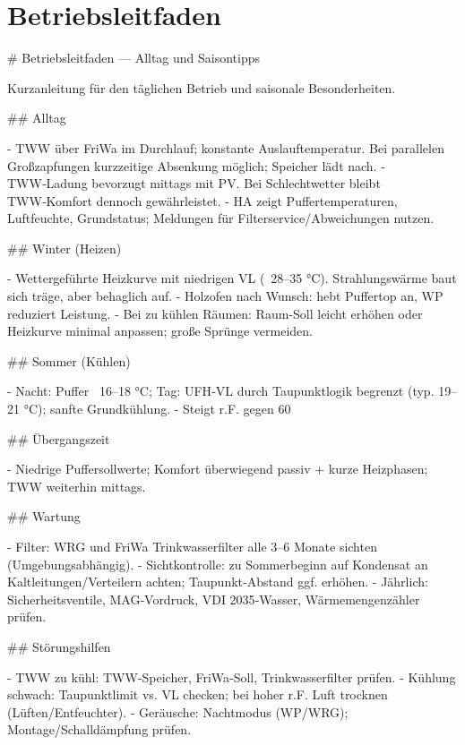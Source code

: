 \documentclass[11pt,oneside]{report}
\begin{document}
\chapter{Betriebsleitfaden}
\begin{markdown}
# Betriebsleitfaden — Alltag und Saisontipps

Kurzanleitung für den täglichen Betrieb und saisonale Besonderheiten.

## Alltag

- TWW über FriWa im Durchlauf; konstante Auslauftemperatur. Bei parallelen Großzapfungen kurzzeitige Absenkung möglich; Speicher lädt nach.
- TWW‑Ladung bevorzugt mittags mit PV. Bei Schlechtwetter bleibt TWW‑Komfort dennoch gewährleistet.
- HA zeigt Puffertemperaturen, Luftfeuchte, Grundstatus; Meldungen für Filterservice/Abweichungen nutzen.

## Winter (Heizen)

- Wettergeführte Heizkurve mit niedrigen VL (~28–35 °C). Strahlungswärme baut sich träge, aber behaglich auf.
- Holzofen nach Wunsch: hebt Puffertop an, WP reduziert Leistung.
- Bei zu kühlen Räumen: Raum‑Soll leicht erhöhen oder Heizkurve minimal anpassen; große Sprünge vermeiden.

## Sommer (Kühlen)

- Nacht: Puffer ~16–18 °C; Tag: UFH‑VL durch Taupunktlogik begrenzt (typ. 19–21 °C); sanfte Grundkühlung.
- Steigt r.F. gegen 60 %

## Übergangszeit

- Niedrige Puffersollwerte; Komfort überwiegend passiv + kurze Heizphasen; TWW weiterhin mittags.

## Wartung

- Filter: WRG und FriWa Trinkwasserfilter alle 3–6 Monate sichten (Umgebungsabhängig).
- Sichtkontrolle: zu Sommerbeginn auf Kondensat an Kaltleitungen/Verteilern achten; Taupunkt‑Abstand ggf. erhöhen.
- Jährlich: Sicherheitsventile, MAG‑Vordruck, VDI 2035‑Wasser, Wärmemengenzähler prüfen.

## Störungshilfen

- TWW zu kühl: TWW‑Speicher, FriWa‑Soll, Trinkwasserfilter prüfen.
- Kühlung schwach: Taupunktlimit vs. VL checken; bei hoher r.F. Luft trocknen (Lüften/Entfeuchter).
- Geräusche: Nachtmodus (WP/WRG); Montage/Schalldämpfung prüfen.
\end{markdown}
\end{document}
